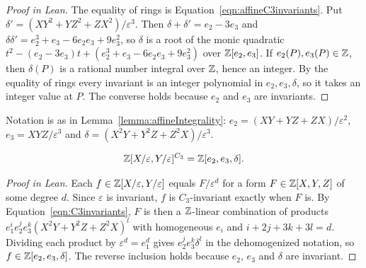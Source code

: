 \begin{proof}[Proof in Lean]

\leanok


The equality of rings is Equation~\ref{eqn:affineC3invariants}. Put $\delta'=(XY^2+YZ^2+ZX^2)/\varepsilon^3$. Then $\delta+\delta'=e_2-3e_3$ and $\delta\delta'=e_2^3+e_3-6e_2e_3+9e_3^2$, so $\delta$ is a root of the monic quadratic $t^2-(e_2-3e_3)t+(e_2^3+e_3-6e_2e_3+9e_3^2)$ over $\mathbb{Z}[e_2,e_3]$. If $e_2(P),e_3(P)\in\mathbb{Z}$, then $\delta(P)$ is a rational number integral over $\mathbb{Z}$, hence an integer. By the equality of rings every invariant is an integer polynomial in $e_2,e_3,\delta$, so it takes an integer value at $P$. The converse holds because $e_2$ and $e_3$ are invariants.

\end{proof}

\begin{equationnode}

\label{eqn:affineC3invariants}


\leanok

Notation is as in Lemma~\ref{lemma:affineIntegrality}: $e_2=(XY+YZ+ZX)/\varepsilon^2$, $e_3=XYZ/\varepsilon^3$ and $\delta=(X^2Y+Y^2Z+Z^2X)/\varepsilon^3$.

\begin{equation*} \mathbb{Z}[X/\varepsilon,Y/\varepsilon]^{C_3} =\mathbb{Z}[e_2,e_3,\delta]. \end{equation*}

\end{equationnode}

\begin{proof}[Proof in Lean]

\leanok


Each $f\in\mathbb{Z}[X/\varepsilon,Y/\varepsilon]$ equals $F/\varepsilon^d$ for a form $F\in\mathbb{Z}[X,Y,Z]$ of some degree $d$. Since $\varepsilon$ is invariant, $f$ is $C_3$-invariant exactly when $F$ is. By Equation~\ref{eqn:C3invariants}, $F$ is then a $\mathbb{Z}$-linear combination of products $e_1^ie_2^je_3^k(X^2Y+Y^2Z+Z^2X)^l$ with homogeneous $e_i$ and $i+2j+3k+3l=d$. Dividing each product by $\varepsilon^d=e_1^d$ gives $e_2^je_3^k\delta^l$ in the dehomogenized notation, so $f\in\mathbb{Z}[e_2,e_3,\delta]$. The reverse inclusion holds because $e_2$, $e_3$ and $\delta$ are invariant.

\end{proof}

